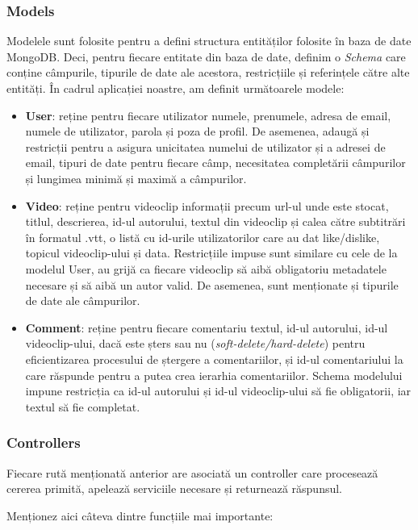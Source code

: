 \subsubsection{Models}
Modelele sunt folosite pentru a defini structura entităților folosite în baza de date MongoDB. Deci,
pentru fiecare entitate din baza de date, definim o \textit{Schema} care conține câmpurile, tipurile
de date ale acestora, restricțiile și referințele către alte entități. În cadrul aplicației noastre,
am definit următoarele modele:
\begin{itemize}
    \item \textbf{User}: reține pentru fiecare utilizator numele, prenumele, adresa de email, numele
    de utilizator, parola și poza de profil. De asemenea, adaugă și restricții pentru a asigura
    unicitatea numelui de utilizator și a adresei de email, tipuri de date pentru fiecare câmp,
    necesitatea completării câmpurilor și lungimea minimă și maximă a câmpurilor.
    \item \textbf{Video}: reține pentru videoclip informații precum url-ul unde este stocat, titlul,
    descrierea, id-ul autorului, textul din videoclip și calea către subtitrări în formatul .vtt,
    o listă cu id-urile utilizatorilor care au dat like/dislike, topicul videoclip-ului și data.
    Restricțiile impuse sunt similare cu cele de la modelul User, au grijă ca fiecare videoclip să
    aibă obligatoriu metadatele necesare și să aibă un autor valid. De asemenea, sunt menționate
    și tipurile de date ale câmpurilor.
    \item \textbf{Comment}: reține pentru fiecare comentariu textul, id-ul autorului, id-ul videoclip-ului,
    dacă este șters sau nu (\textit{soft-delete/hard-delete}) pentru eficientizarea procesului de ștergere
    a comentariilor, și id-ul comentariului la care răspunde pentru a putea crea ierarhia comentariilor.
    Schema modelului impune restricția ca id-ul autorului și id-ul videoclip-ului să fie obligatorii,
    iar textul să fie completat.
\end{itemize}


\subsubsection{Controllers}
Fiecare rută menționată anterior are asociată un controller care procesează cererea primită, 
apelează serviciile necesare și returnează răspunsul.
\par
Menționez aici câteva dintre funcțiile mai importante:

